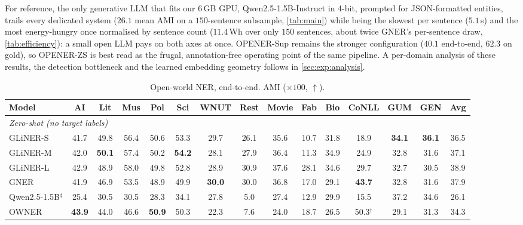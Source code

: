 For reference, the only generative LLM that fits our $6$\,GB GPU, Qwen2.5-1.5B-Instruct \cite{qwen2025} in 4-bit, prompted for JSON-formatted entities, trails every dedicated system ($26.1$ mean AMI on a $150$-sentence subsample, \autoref{tab:main}) while being the slowest per sentence ($5.1$\,s) and the most energy-hungry once normalised by sentence count ($11.4$\,Wh over only $150$ sentences, about twice GNER's per-sentence draw, \autoref{tab:efficiency}): a small open LLM pays on both axes at once.
OPENER-Sup remains the stronger configuration ($40.1$ end-to-end, $62.3$ on gold), so OPENER-ZS is best read as the frugal, annotation-free operating point of the same pipeline.
A per-domain analysis of these results, the detection bottleneck and the learned embedding geometry follows in \autoref{sec:exp:analysis}.

\begin{table}[H]
\centering
\caption{Open-world NER, end-to-end. AMI ($\times 100$, $\uparrow$).}
\label{tab:main}
\scriptsize
\setlength{\tabcolsep}{2.5pt}
\begin{threeparttable}
\begin{tabular}{l*{13}{c}c}
\toprule
Model & AI & Lit & Mus & Pol & Sci & WNUT & Rest & Movie & Fab & Bio & CoNLL & GUM & GEN & Avg \\
\midrule
\multicolumn{15}{l}{\emph{Zero-shot (no target labels)}} \\
GLiNER-S & 41.7 & 49.8 & 56.4 & 50.6 & 53.3 & 29.7 & 26.1 & 35.6 & 10.7 & 31.8 & 18.9 & \textbf{34.1} & \textbf{36.1} & 36.5 \\
GLiNER-M & 42.0 & \textbf{50.1} & 57.4 & 50.2 & \textbf{54.2} & 28.1 & 27.9 & 36.4 & 11.3 & 34.9 & 24.9 & 32.8 & 31.6 & 37.1 \\
GLiNER-L & 42.9 & 48.9 & 58.0 & 49.8 & 52.8 & 28.9 & 30.9 & 37.6 & 28.1 & 34.6 & 29.7 & 32.7 & 30.5 & 38.9 \\
GNER & 41.9 & 46.9 & 53.5 & 48.9 & 49.9 & \textbf{30.0} & 30.0 & 36.8 & 17.0 & 29.1 & \textbf{43.7} & 32.8 & 31.6 & 37.9 \\
Qwen2.5-1.5B$^\ddagger$ & 25.4 & 30.5 & 30.5 & 28.3 & 34.1 & 27.8 & 5.0 & 27.4 & 12.9 & 29.9 & 15.5 & 37.2 & 34.6 & 26.1 \\
OWNER & \textbf{43.9} & 44.0 & 46.6 & \textbf{50.9} & 50.3 & 22.3 & 7.6 & 24.0 & 18.7 & 26.5 & 50.3$^\dagger$ & 29.1 & 31.3 & 34.3 \\

\end{tabular}
\end{threeparttable}
\end{table}
